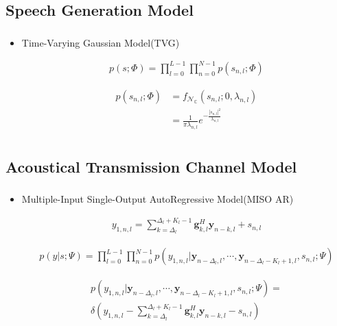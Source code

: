 \documentclass{beamer}
\begin{document}
\subsection{Speech Generation Model}
\frame
{
  \frametitle{\subsecname}
  
  \begin{itemize}
  \item{Time-Varying Gaussian Model(TVG)}

   \begin{align*}
      p(s; \Phi) = \prod^{L-1}_{l=0}\prod^{N-1}_{n=0}p(s_{n,l}; \Phi)
   \end{align*}
   
   \begin{align*}
      p(s_{n,l}; \Phi) &= f_{\mathcal{N}_\mathbb{C}}(s_{n,l}; 0, \lambda_{n,l}) \\
                                 &= \frac{1}{\pi\lambda_{n,l}}e^{-\frac{|s_{n,l}|^2}{\lambda_{n,l}}}\\
   \end{align*}
   
   \end{itemize}
}

\subsection{Acoustical Transmission Channel Model}
\frame
{
  \frametitle{\subsecname}
  
  \begin{itemize}
  \item{\small{Multiple-Input Single-Output AutoRegressive Model(MISO AR)}}

   \begin{align*}
      y_{1,n,l} = \sum_{k=\Delta_l}^{\Delta_l+K_l-1}\mathbf{g}^{H}_{k,l} \mathbf{y}_{n-k,l} + s_{n,l}
   \end{align*}
   
   \begin{align*}
      p(y|s; \Psi) = \prod^{L-1}_{l=0}\prod^{N-1}_{n=0}p(y_{1,n,l} | \mathbf{y}_{n-\Delta_l,l}, \cdots, \mathbf{y}_{n-\Delta_l-K_l+1,l}, s_{n,l}; \Psi)
   \end{align*}
   
   \begin{multline*}
      p(y_{1,n,l} | \mathbf{y}_{n-\Delta_l,l}, \cdots, \mathbf{y}_{n-\Delta_l-K_l+1,l}, s_{n,l}; \Psi) = \\
                              \delta(y_{1,n,l} - \sum_{k=\Delta_l}^{\Delta_l+K_l-1}\mathbf{g}^{H}_{k,l} \mathbf{y}_{n-k,l} - s_{n,l})
   \end{multline*}
   
   \end{itemize}
}
\end{document}
